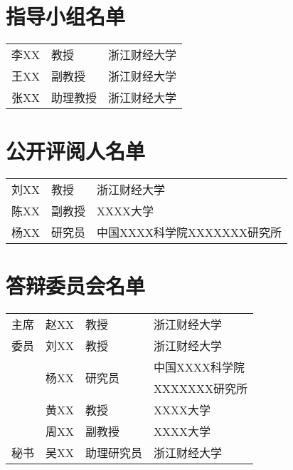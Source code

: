 \renewcommand{\baselinestretch}{1.5}
\setlength{\parskip}{1em}
\section*{指导小组名单}

\begin{center}
	\begin{tabular}{p{3cm}p{3cm}p{9cm}}
		李XX & 教授     & 浙江财经大学 \\
		王XX & 副教授   & 浙江财经大学 \\
		张XX & 助理教授 & 浙江财经大学 \\		
	\end{tabular}
\end{center}


\section*{公开评阅人名单}

\begin{center}
	\begin{tabular}{p{3cm}p{3cm}p{9cm}}
		刘XX & 教授   & 浙江财经大学                    \\
		陈XX & 副教授 & XXXX大学                    \\
		杨XX & 研究员 & 中国XXXX科学院XXXXXXX研究所 \\
	\end{tabular}
\end{center}


\section*{答辩委员会名单}

\begin{center}
	\begin{tabular}{p{2.75cm}p{2.98cm}p{4.63cm}p{4.63cm}}
		主席 & 赵XX                  & 教授                    & 浙江财经大学       \\
		委员 & 刘XX                  & 教授                    & 浙江财经大学       \\
		& \multirow{2}{*}{杨XX} & \multirow{2}{*}{研究员} & 中国XXXX科学院 \\
		&                       &                         & XXXXXXX研究所  \\
		& 黄XX                  & 教授                    & XXXX大学       \\
		& 周XX                  & 副教授                  & XXXX大学       \\
		秘书 & 吴XX                  & 助理研究员              & 浙江财经大学       \\
	\end{tabular}

\end{center}
